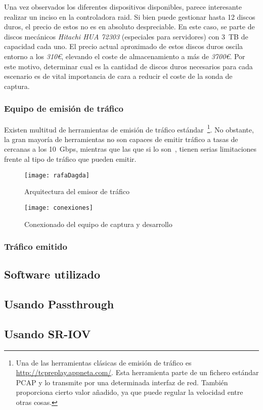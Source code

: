 Una vez observados los diferentes dispositivos disponibles, parece interesante realizar un inciso en la controladora raid.
Si bien puede gestionar hasta 12 discos duros, el precio de estos no es en absoluto despreciable.
En este caso, se parte de discos mecánicos \textit{Hitachi HUA 72303} (especiales para servidores) con 3~TB de capacidad cada uno.
El precio actual aproximado de estos discos duros oscila entorno a los \textit{310€}, elevando el coste de almacenamiento a más de \textit{3700€}.
Por este motivo, determinar cual es la cantidad de discos duros necesarios para cada escenario es de vital importancia de cara a reducir el coste de la sonda de captura.


\subsubsection{Equipo de emisión de tráfico}

Existen multitud de herramientas de emisión de tráfico estándar~\footnote{Una de las herramientas clásicas de emisión de tráfico es \href{TCPReplay}{http://tcpreplay.appneta.com/}. Esta herramienta parte de un fichero estándar PCAP y lo transmite por una determinada interfaz de red. También proporciona cierto valor añadido, ya que puede regular la velocidad entre otras cosas.}. No obstante, la gran mayoría de herramientas no son capaces de emitir tráfico a tasas de cercanas a los 10~Gbps, mientras que las que si lo son~\cite{bib:dpdkpktgen}, tienen serias limitaciones frente al tipo de tráfico que pueden emitir.

\begin{figure}[!htb]
\centering
\texttt{[image: rafaDagda]}
\caption{Arquitectura del emisor de tráfico}
\label{fig:dis:dpdkdd}
\end{figure}

\begin{figure}[!htb]
\centering
\texttt{[image: conexiones]}
\caption{Conexionado del equipo de captura y desarrollo}
\label{fig:dis:dpdkdd}
\end{figure}


\subsubsection{Tráfico emitido}

\subsection{Software utilizado\label{sec:sw}}




\subsection{Usando Passthrough\label{sec:pt}}

\subsection{Usando SR-IOV\label{sec:sriov}}